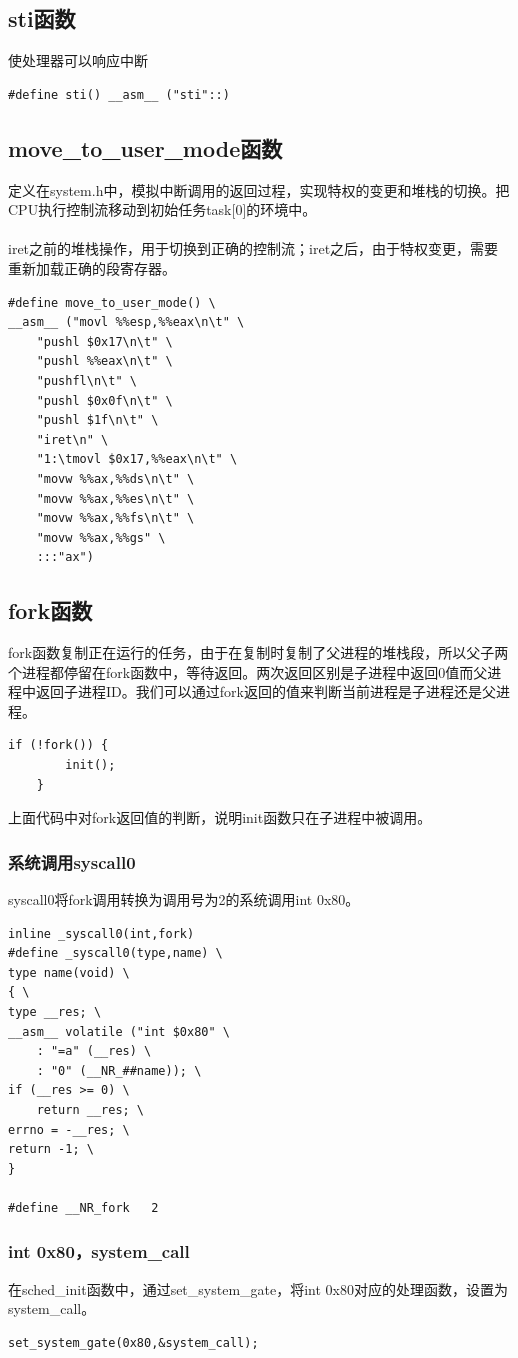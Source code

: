 \documentclass[12pt]{article}
\begin{document}
\subsection{sti函数}	
使处理器可以响应中断
\begin{lstlisting}[breaklines]
#define sti() __asm__ ("sti"::)
\end{lstlisting}	
\subsection{move\_to\_user\_mode函数}
定义在system.h中，模拟中断调用的返回过程，实现特权的变更和堆栈的切换。把CPU执行控制流移动到初始任务task[0]的环境中。\\\\
iret之前的堆栈操作，用于切换到正确的控制流；iret之后，由于特权变更，需要重新加载正确的段寄存器。
\begin{lstlisting}[breaklines]
#define move_to_user_mode() \
__asm__ ("movl %%esp,%%eax\n\t" \
	"pushl $0x17\n\t" \
	"pushl %%eax\n\t" \
	"pushfl\n\t" \
	"pushl $0x0f\n\t" \
	"pushl $1f\n\t" \
	"iret\n" \
	"1:\tmovl $0x17,%%eax\n\t" \
	"movw %%ax,%%ds\n\t" \
	"movw %%ax,%%es\n\t" \
	"movw %%ax,%%fs\n\t" \
	"movw %%ax,%%gs" \
	:::"ax")
\end{lstlisting}	
\subsection{fork函数}	
fork函数复制正在运行的任务，由于在复制时复制了父进程的堆栈段，所以父子两个进程都停留在fork函数中，等待返回。两次返回区别是子进程中返回0值而父进程中返回子进程ID。我们可以通过fork返回的值来判断当前进程是子进程还是父进程。
\begin{lstlisting}[breaklines]
	if (!fork()) {
		init();
	}
\end{lstlisting}
上面代码中对fork返回值的判断，说明init函数只在子进程中被调用。
\subsubsection{系统调用syscall0}	
syscall0将fork调用转换为调用号为2的系统调用int 0x80。
\begin{lstlisting}[breaklines]
inline _syscall0(int,fork)
#define _syscall0(type,name) \
type name(void) \
{ \
type __res; \
__asm__ volatile ("int $0x80" \
	: "=a" (__res) \
	: "0" (__NR_##name)); \
if (__res >= 0) \
	return __res; \
errno = -__res; \
return -1; \
}

#define __NR_fork	2
\end{lstlisting}	
\subsubsection{int 0x80，system\_call}	
在sched\_init函数中，通过set\_system\_gate，将int 0x80对应的处理函数，设置为system\_call。
\begin{lstlisting}[breaklines]
set_system_gate(0x80,&system_call);
\end{lstlisting}
\end{document}
